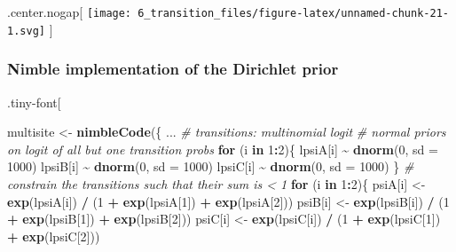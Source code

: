 \documentclass[
]{article}
\newenvironment{Shaded}{\begin{snugshade}}{\end{snugshade}}
\newcommand{\CommentTok}[1]{\textcolor[rgb]{0.56,0.35,0.01}{\textit{#1}}}
\newcommand{\ControlFlowTok}[1]{\textcolor[rgb]{0.13,0.29,0.53}{\textbf{#1}}}
\newcommand{\DataTypeTok}[1]{\textcolor[rgb]{0.13,0.29,0.53}{#1}}
\newcommand{\DecValTok}[1]{\textcolor[rgb]{0.00,0.00,0.81}{#1}}
\newcommand{\KeywordTok}[1]{\textcolor[rgb]{0.13,0.29,0.53}{\textbf{#1}}}
\newcommand{\NormalTok}[1]{#1}
\newcommand{\OperatorTok}[1]{\textcolor[rgb]{0.81,0.36,0.00}{\textbf{#1}}}
\newcommand{\StringTok}[1]{\textcolor[rgb]{0.31,0.60,0.02}{#1}}
\begin{document}
.center.nogap{[}
\texttt{[image: 6\_transition\_files/figure-latex/unnamed-chunk-21-1.svg]}
{]}

\hypertarget{nimble-implementation-of-the-dirichlet-prior}{%
\subsubsection{Nimble implementation of the Dirichlet
prior}\label{nimble-implementation-of-the-dirichlet-prior}}

.tiny-font{[}

\begin{Shaded}
\begin{Highlighting}[]
\NormalTok{multisite \textless{}{-}}\StringTok{ }\KeywordTok{nimbleCode}\NormalTok{(\{}
\NormalTok{...}
  \CommentTok{\# transitions: multinomial logit}
  \CommentTok{\# normal priors on logit of all but one transition probs}
  \ControlFlowTok{for}\NormalTok{ (i }\ControlFlowTok{in} \DecValTok{1}\OperatorTok{:}\DecValTok{2}\NormalTok{)\{}
\NormalTok{    lpsiA[i] }\OperatorTok{\textasciitilde{}}\StringTok{ }\KeywordTok{dnorm}\NormalTok{(}\DecValTok{0}\NormalTok{, }\DataTypeTok{sd =} \DecValTok{1000}\NormalTok{)}
\NormalTok{    lpsiB[i] }\OperatorTok{\textasciitilde{}}\StringTok{ }\KeywordTok{dnorm}\NormalTok{(}\DecValTok{0}\NormalTok{, }\DataTypeTok{sd =} \DecValTok{1000}\NormalTok{)}
\NormalTok{    lpsiC[i] }\OperatorTok{\textasciitilde{}}\StringTok{ }\KeywordTok{dnorm}\NormalTok{(}\DecValTok{0}\NormalTok{, }\DataTypeTok{sd =} \DecValTok{1000}\NormalTok{)}
\NormalTok{  \}}
  \CommentTok{\# constrain the transitions such that their sum is \textless{} 1}
  \ControlFlowTok{for}\NormalTok{ (i }\ControlFlowTok{in} \DecValTok{1}\OperatorTok{:}\DecValTok{2}\NormalTok{)\{}
\NormalTok{    psiA[i] \textless{}{-}}\StringTok{ }\KeywordTok{exp}\NormalTok{(lpsiA[i]) }\OperatorTok{/}\StringTok{ }\NormalTok{(}\DecValTok{1} \OperatorTok{+}\StringTok{ }\KeywordTok{exp}\NormalTok{(lpsiA[}\DecValTok{1}\NormalTok{]) }\OperatorTok{+}\StringTok{ }\KeywordTok{exp}\NormalTok{(lpsiA[}\DecValTok{2}\NormalTok{]))}
\NormalTok{    psiB[i] \textless{}{-}}\StringTok{ }\KeywordTok{exp}\NormalTok{(lpsiB[i]) }\OperatorTok{/}\StringTok{ }\NormalTok{(}\DecValTok{1} \OperatorTok{+}\StringTok{ }\KeywordTok{exp}\NormalTok{(lpsiB[}\DecValTok{1}\NormalTok{]) }\OperatorTok{+}\StringTok{ }\KeywordTok{exp}\NormalTok{(lpsiB[}\DecValTok{2}\NormalTok{]))}
\NormalTok{    psiC[i] \textless{}{-}}\StringTok{ }\KeywordTok{exp}\NormalTok{(lpsiC[i]) }\OperatorTok{/}\StringTok{ }\NormalTok{(}\DecValTok{1} \OperatorTok{+}\StringTok{ }\KeywordTok{exp}\NormalTok{(lpsiC[}\DecValTok{1}\NormalTok{]) }\OperatorTok{+}\StringTok{ }\KeywordTok{exp}\NormalTok{(lpsiC[}\DecValTok{2}\NormalTok{]))}

\end{Highlighting}
\end{Shaded}
\end{document}
